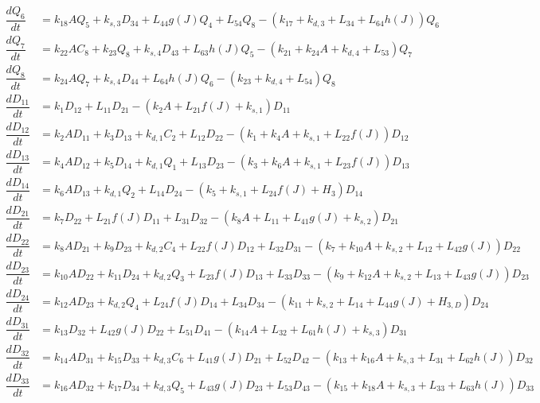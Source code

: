 \begin{align*}
\dfrac{dQ_{6}}{dt} & =k_{18}AQ_{5}+k_{s,3}D_{34}+L_{44}g\left(J\right)Q_{4}+L_{54}Q_{8}-\left(k_{17}+k_{d,3}+L_{34}+L_{64}h\left(J\right)\right)Q_{6}\\
\dfrac{dQ_{7}}{dt} & =k_{22}AC_{8}+k_{23}Q_{8}+k_{s,4}D_{43}+L_{63}h\left(J\right)Q_{5}-\left(k_{21}+k_{24}A+k_{d,4}+L_{53}\right)Q_{7}\\
\dfrac{dQ_{8}}{dt} & =k_{24}AQ_{7}+k_{s,4}D_{44}+L_{64}h\left(J\right)Q_{6}-\left(k_{23}+k_{d,4}+L_{54}\right)Q_{8}\\
\dfrac{dD_{11}}{dt} & =k_{1}D_{12}+L_{11}D_{21}-\left(k_{2}A+L_{21}f\left(J\right)+k_{s,1}\right)D_{11}\\
\dfrac{dD_{12}}{dt} & =k_{2}AD_{11}+k_{3}D_{13}+k_{d,1}C_{2}+L_{12}D_{22}-\left(k_{1}+k_{4}A+k_{s,1}+L_{22}f\left(J\right)\right)D_{12}\\
\dfrac{dD_{13}}{dt} & =k_{4}AD_{12}+k_{5}D_{14}+k_{d,1}Q_{1}+L_{13}D_{23}-\left(k_{3}+k_{6}A+k_{s,1}+L_{23}f\left(J\right)\right)D_{13}\\
\dfrac{dD_{14}}{dt} & =k_{6}AD_{13}+k_{d,1}Q_{2}+L_{14}D_{24}-\left(k_{5}+k_{s,1}+L_{24}f\left(J\right)+H_{3}\right)D_{14}\\
\dfrac{dD_{21}}{dt} & =k_{7}D_{22}+L_{21}f\left(J\right)D_{11}+L_{31}D_{32}-\left(k_{8}A+L_{11}+L_{41}g\left(J\right)+k_{s,2}\right)D_{21}\\
\dfrac{dD_{22}}{dt} & =k_{8}AD_{21}+k_{9}D_{23}+k_{d,2}C_{4}+L_{22}f\left(J\right)D_{12}+L_{32}D_{31}-\left(k_{7}+k_{10}A+k_{s,2}+L_{12}+L_{42}g\left(J\right)\right)D_{22}\\
\dfrac{dD_{23}}{dt} & =k_{10}AD_{22}+k_{11}D_{24}+k_{d,2}Q_{3}+L_{23}f\left(J\right)D_{13}+L_{33}D_{33}-\left(k_{9}+k_{12}A+k_{s,2}+L_{13}+L_{43}g\left(J\right)\right)D_{23}\\
\dfrac{dD_{24}}{dt} & =k_{12}AD_{23}+k_{d,2}Q_{4}+L_{24}f\left(J\right)D_{14}+L_{34}D_{34}-\left(k_{11}+k_{s,2}+L_{14}+L_{44}g\left(J\right)+H_{3,D}\right)D_{24}\\
\dfrac{dD_{31}}{dt} & =k_{13}D_{32}+L_{42}g\left(J\right)D_{22}+L_{51}D_{41}-\left(k_{14}A+L_{32}+L_{61}h\left(J\right)+k_{s,3}\right)D_{31}\\
\dfrac{dD_{32}}{dt} & =k_{14}AD_{31}+k_{15}D_{33}+k_{d,3}C_{6}+L_{41}g\left(J\right)D_{21}+L_{52}D_{42}-\left(k_{13}+k_{16}A+k_{s,3}+L_{31}+L_{62}h\left(J\right)\right)D_{32}\\
\dfrac{dD_{33}}{dt} & =k_{16}AD_{32}+k_{17}D_{34}+k_{d,3}Q_{5}+L_{43}g\left(J\right)D_{23}+L_{53}D_{43}-\left(k_{15}+k_{18}A+k_{s,3}+L_{33}+L_{63}h\left(J\right)\right)D_{33}\\

\end{align*}
